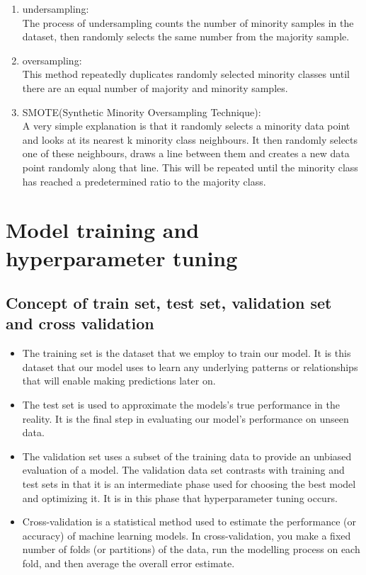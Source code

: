 \documentclass[
]{book}
\providecommand{\tightlist}{%
  \setlength{\itemsep}{0pt}\setlength{\parskip}{0pt}}
\begin{document}
\begin{enumerate}
\def\labelenumi{\arabic{enumi}.}
\item
  undersampling:\\
  The process of undersampling counts the number of minority samples in the dataset, then randomly selects the same number from the majority sample.
\item
  oversampling:\\
  This method repeatedly duplicates randomly selected minority classes until there are an equal number of majority and minority samples.
\item
  SMOTE(Synthetic Minority Oversampling Technique):\\
  A very simple explanation is that it randomly selects a minority data point and looks at its nearest k minority class neighbours. It then randomly selects one of these neighbours, draws a line between them and creates a new data point randomly along that line. This will be repeated until the minority class has reached a predetermined ratio to the majority class.
\end{enumerate}

\hypertarget{model-training-and-hyperparameter-tuning}{%
\chapter{Model training and hyperparameter tuning}\label{model-training-and-hyperparameter-tuning}}

\hypertarget{concept-of-train-set-test-set-validation-set-and-cross-validation}{%
\section{Concept of train set, test set, validation set and cross validation}\label{concept-of-train-set-test-set-validation-set-and-cross-validation}}

\begin{itemize}
\tightlist
\item
  The training set is the dataset that we employ to train our model. It is this dataset that our model uses to learn any underlying patterns or relationships that will enable making predictions later on.
\item
  The test set is used to approximate the models's true performance in the reality. It is the final step in evaluating our model's performance on unseen data.
\item
  The validation set uses a subset of the training data to provide an unbiased evaluation of a model. The validation data set contrasts with training and test sets in that it is an intermediate phase used for choosing the best model and optimizing it. It is in this phase that hyperparameter tuning occurs.
\item
  Cross-validation is a statistical method used to estimate the performance (or accuracy) of machine learning models. In cross-validation, you make a fixed number of folds (or partitions) of the data, run the modelling process on each fold, and then average the overall error estimate.
\end{itemize}
\end{document}

